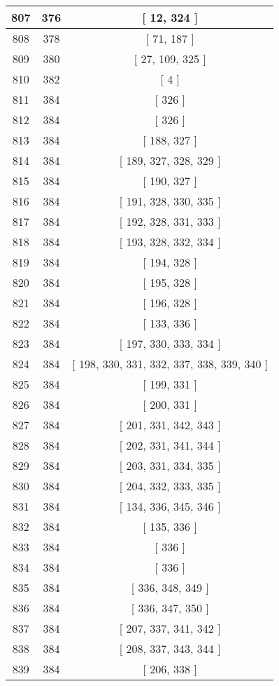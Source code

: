 \begin{center}
\begin{longtable}[H]{|| c c c ||}
\hline
807 & 376 & [ 12, 324 ] \\ 
\hline
808 & 378 & [ 71, 187 ] \\ 
\hline
809 & 380 & [ 27, 109, 325 ] \\ 
\hline
810 & 382 & [ 4 ] \\ 
\hline
811 & 384 & [ 326 ] \\ 
\hline
812 & 384 & [ 326 ] \\ 
\hline
813 & 384 & [ 188, 327 ] \\ 
\hline
814 & 384 & [ 189, 327, 328, 329 ] \\ 
\hline
815 & 384 & [ 190, 327 ] \\ 
\hline
816 & 384 & [ 191, 328, 330, 335 ] \\ 
\hline
817 & 384 & [ 192, 328, 331, 333 ] \\ 
\hline
818 & 384 & [ 193, 328, 332, 334 ] \\ 
\hline
819 & 384 & [ 194, 328 ] \\ 
\hline
820 & 384 & [ 195, 328 ] \\ 
\hline
821 & 384 & [ 196, 328 ] \\ 
\hline
822 & 384 & [ 133, 336 ] \\ 
\hline
823 & 384 & [ 197, 330, 333, 334 ] \\ 
\hline
824 & 384 & [ 198, 330, 331, 332, 337, 338, 339, 340 ] \\ 
\hline
825 & 384 & [ 199, 331 ] \\ 
\hline
826 & 384 & [ 200, 331 ] \\ 
\hline
827 & 384 & [ 201, 331, 342, 343 ] \\ 
\hline
828 & 384 & [ 202, 331, 341, 344 ] \\ 
\hline
829 & 384 & [ 203, 331, 334, 335 ] \\ 
\hline
830 & 384 & [ 204, 332, 333, 335 ] \\ 
\hline
831 & 384 & [ 134, 336, 345, 346 ] \\ 
\hline
832 & 384 & [ 135, 336 ] \\ 
\hline
833 & 384 & [ 336 ] \\ 
\hline
834 & 384 & [ 336 ] \\ 
\hline
835 & 384 & [ 336, 348, 349 ] \\ 
\hline
836 & 384 & [ 336, 347, 350 ] \\ 
\hline
837 & 384 & [ 207, 337, 341, 342 ] \\ 
\hline
838 & 384 & [ 208, 337, 343, 344 ] \\ 
\hline
839 & 384 & [ 206, 338 ] \\ 

\end{longtable}
\end{center}

